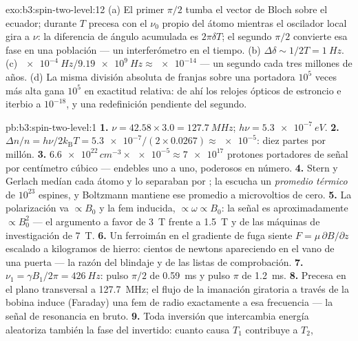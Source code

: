 \begin{solution}{exo:b3:spin-two-level:12}
(a) El primer $\pi/2$ tumba el vector de Bloch sobre el ecuador; durante
$T$ precesa con el $\nu_0$ propio del átomo mientras el oscilador
local gira a $\nu$: la diferencia de ángulo acumulada es
$2\pi\delta T$; el segundo $\pi/2$ convierte esa fase en una
población --- un interferómetro en el tiempo. (b) $\Delta\delta \sim
1/2T = \qty{1}{Hz}$. (c) $\qty{e-4}{Hz}/\qty{9.19e9}{Hz} \approx
\num{e-14}$ --- un segundo cada tres millones de años. (d) La misma
división absoluta de franjas sobre una portadora $10^5$ veces más alta gana
$10^5$ en exactitud relativa: de ahí los relojes ópticos de estroncio e
iterbio a $10^{-18}$, y una redefinición pendiente del segundo.
\end{solution}

\begin{solution}{pb:b3:spin-two-level:1}
\textbf{1.} $\nu = 42.58 \times 3.0 = \qty{127.7}{MHz}$; $h\nu =
\qty{5.3e-7}{eV}$.
\textbf{2.} $\Delta n/n = h\nu/2k_{\text{B}}T = \num{5.3e-7}/(2
\times 0.0267) \approx \num{e-5}$: diez partes por millón.
\textbf{3.} $\num{6.6e22}\,\unit{cm^{-3}} \times \num{e-5} \approx
\num{7e17}$ protones portadores de señal por centímetro cúbico --- endebles
uno a uno, poderosos en número.
\textbf{4.} Stern y Gerlach medían cada átomo y lo separaban por
; la  escucha un \emph{promedio térmico} de
$10^{23}$ espines, y Boltzmann mantiene ese promedio a microvoltios de cero.
\textbf{5.} La polarización va $\propto B_0$ y la fem inducida,
$\propto \omega \propto B_0$: la señal es aproximadamente $\propto B_0^2$
--- el argumento a favor de \qty{3}{T} frente a \qty{1.5}{T} y de las
máquinas de investigación de \qty{7}{T}.
\textbf{6.} Un ferroimán en el gradiente de fuga siente
$F = \mu\,\partial B/\partial z$ escalado a kilogramos de hierro:
cientos de newtons apareciendo en el vano de una puerta --- la razón del
blindaje y de las listas de comprobación.
\textbf{7.} $\nu_1 = \gamma B_1/2\pi = \qty{426}{Hz}$: pulso $\pi/2$ de
\qty{0.59}{ms} y pulso $\pi$ de \qty{1.2}{ms}.
\textbf{8.} Precesa en el plano transversal a
\qty{127.7}{MHz}; el flujo de la imanación giratoria a través de la
bobina induce (Faraday) una fem de radio exactamente a esa frecuencia ---
la señal de resonancia en bruto.
\textbf{9.} Toda inversión que intercambia energía aleatoriza también la
fase del  invertido: cuanto causa $T_1$ contribuye a $T_2$,

\end{solution}
